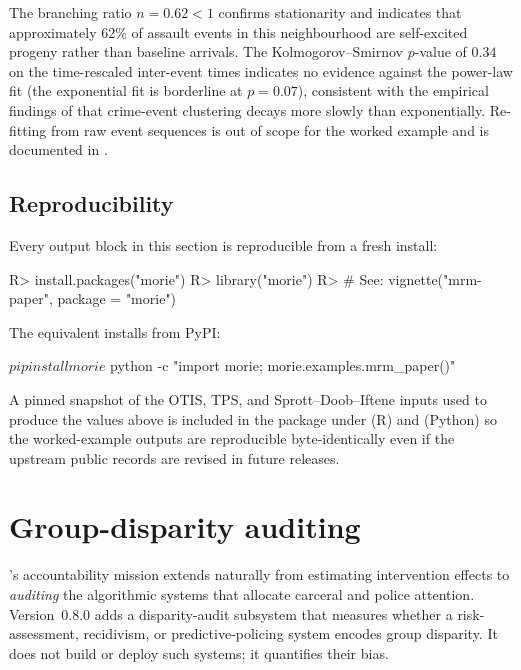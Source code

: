 \documentclass[article,shortnames,nojss]{jss}
\begin{document}
The branching ratio $n = 0.62 < 1$ confirms stationarity and
indicates that approximately $62\%$ of assault events in this
neighbourhood are self-excited progeny rather than baseline
arrivals.  The Kolmogorov--Smirnov $p$-value of $0.34$ on the
time-rescaled inter-event times indicates no evidence against
the power-law fit (the exponential fit is borderline at
$p = 0.07$), consistent with the empirical findings of
\citet{Mohler2011} that crime-event clustering decays more slowly
than exponentially.  Re-fitting from raw event sequences is
out of scope for the worked example and is documented in
\citet{Ruhela2026Hawkes}.

\subsection{Reproducibility}

Every output block in this section is reproducible from a fresh
install:

\begin{CodeChunk}
\begin{CodeInput}
R> install.packages("morie")
R> library("morie")
R> # See: vignette("mrm-paper", package = "morie")
\end{CodeInput}
\end{CodeChunk}

The  equivalent installs from PyPI:

\begin{CodeChunk}
\begin{CodeInput}
$ pip install morie
$ python -c "import morie; morie.examples.mrm_paper()"
\end{CodeInput}
\end{CodeChunk}

A pinned snapshot of the OTIS, TPS, and Sprott--Doob--Iftene
inputs used to produce the values above is included in the
package under  (R) and
 (Python) so the worked-example outputs are
reproducible byte-identically even if the upstream public records
are revised in future releases.

\section{Group-disparity auditing}
\label{sec:fairness}

's accountability mission extends naturally from estimating
intervention effects to \emph{auditing} the algorithmic systems that
allocate carceral and police attention.  Version~0.8.0 adds a
disparity-audit subsystem that measures whether a risk-assessment,
recidivism, or predictive-policing system encodes group disparity.  It
does not build or deploy such systems; it quantifies their bias.
\end{document}
